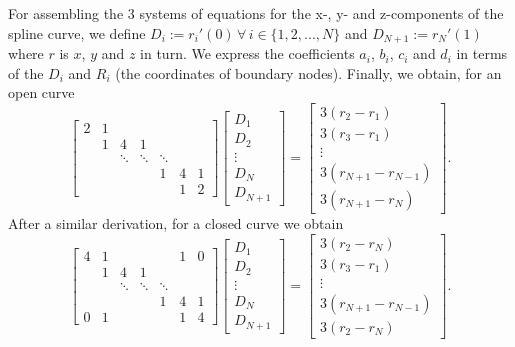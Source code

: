 For assembling the 3 systems of equations for the x-, y- and z-components of the spline curve, we define $D_i := r_i'(0) \, \forall \, i \in \{1,2,...,N\}$ and $D_{N+1} := r_N'(1)$ where $r$ is $x$, $y$ and $z$ in turn. We express the coefficients $a_i$, $b_i$, $c_i$ and $d_i$ in terms of the $D_i$ and $R_i$ (the coordinates of boundary nodes). Finally, we obtain, for an open curve
\begin{equation}
\begin{bmatrix}
2 & 1 & & & & & \\
 & 1 & 4 & 1 & & & \\
 & & \ddots & \ddots & \ddots & &\\
 & & & & 1 & 4 & 1 \\
 & & & & & 1 & 2
\end{bmatrix}
\begin{bmatrix}
D_1 \\
D_2 \\
\vdots \\
D_N \\
D_{N+1}
\end{bmatrix}
=
\begin{bmatrix}
3(r_2 - r_1) \\
3(r_3 - r_1) \\
\vdots \\
3(r_{N+1}-r_{N-1}) \\
3(r_{N+1} - r_N)
\end{bmatrix}.
\end{equation}
After a similar derivation, for a closed curve we obtain
\begin{equation}
\begin{bmatrix}
4 & 1 & & & & 1 & 0 \\
& 1 & 4 & 1 & & & \\
& & \ddots & \ddots & \ddots & &\\
& & & & 1 & 4 & 1 \\
0 &1 & & & & 1 & 4
\end{bmatrix}
\begin{bmatrix}
D_1 \\
D_2 \\
\vdots \\
D_N \\
D_{N+1}
\end{bmatrix}
=
\begin{bmatrix}
3(r_2 - r_{N}) \\
3(r_3 - r_1) \\
\vdots \\
3(r_{N+1}-r_{N-1}) \\
3(r_2 - r_N)
\end{bmatrix}.
\end{equation}

